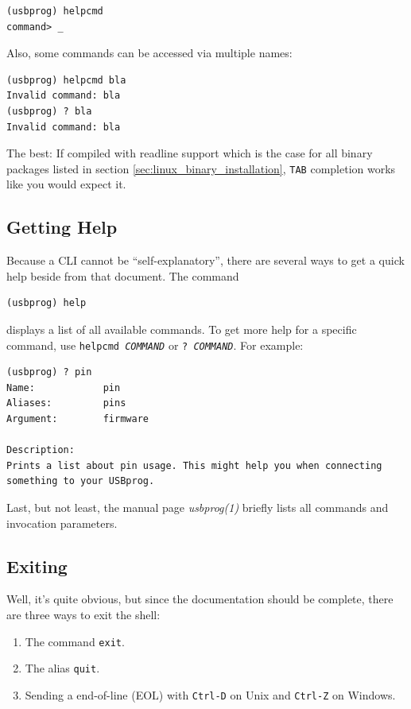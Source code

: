 \documentclass[bibtotoc,UKenglish,halfparskip,oneside,DIV12]{scrreprt}
\begin{document}
\begin{lstlisting}[style=inline]
(usbprog) helpcmd
command> _
\end{lstlisting}

Also, some commands can be accessed via multiple names:

\begin{lstlisting}[style=inline]
(usbprog) helpcmd bla
Invalid command: bla
(usbprog) ? bla
Invalid command: bla
\end{lstlisting}

The best: If compiled with readline support which is the case for all binary packages listed in
section \vref{sec:linux_binary_installation}, \texttt{TAB} completion works like you would expect
it.


\subsection{Getting Help}

Because a CLI cannot be ``self-explanatory'', there are several ways to get a quick help beside from
that document. The command

\begin{lstlisting}[style=inline]
(usbprog) help
\end{lstlisting}

displays a list of all available commands. To get more help for a specific command, use
\texttt{helpcmd \emph{COMMAND}} or \texttt{? \emph{COMMAND}}. For example:

\begin{lstlisting}[style=inline]
(usbprog) ? pin
Name:            pin
Aliases:         pins
Argument:        firmware

Description:
Prints a list about pin usage. This might help you when connecting
something to your USBprog.
\end{lstlisting}

Last, but not least, the manual page \emph{usbprog(1)} briefly lists all commands and invocation
parameters.

\subsection{Exiting}

Well, it's quite obvious, but since the documentation should be complete, there are three ways to
exit the shell:

\begin{enumerate}
  \item The command \texttt{exit}.
  \item The alias \texttt{quit}.
  \item Sending a end-of-line (EOL) with \texttt{Ctrl-D} on Unix and \texttt{Ctrl-Z} on Windows.
\end{enumerate}
\end{document}
